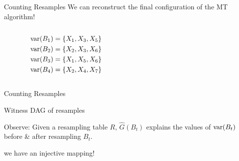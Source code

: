 \documentclass{beamer}
\def\spadding{\vspace{0.25cm}}
\def\b{\textcolor{blue}}
\def\r{\textcolor{red}}
\begin{document}
\begin{frame}{Counting Resamples}
We can reconstruct the final configuration of the MT algorithm!\spadding

\begin{columns}[T]
\begin{column}{.4\textwidth}
\centering\spadding

{\small
\vspace{-2em}\begin{align*}
\mathrm{var}(B_1) = \{X_1,X_3,X_5\} \\
\mathrm{var}(B_2) = \{X_2,X_3,X_6\} \\
\mathrm{var}(B_3) = \{X_1,X_5,X_6\} \\
\mathrm{var}(B_4) = \{X_2,X_4,X_7\}
\end{align*}
}
\end{column}\pause
\begin{column}{.4\textwidth}
\centering\spadding

\onslide<3->{resamples: \b{$B_1$}}\onslide<6,9->{, \r{$B_4$}}
\end{column}
\begin{column}{.1\textwidth}
\end{column}
\end{columns}\spadding



\end{frame}

\begin{frame}{Counting Resamples}
\begin{block}{Witness DAG of resamples}
\begin{center}

\end{center}

Observe: Given a resampling table $R$, $\hat{G}(B_t)$ explains the values of $\mathrm{var}(B_t)$ before \& after resampling $B_t$.\pause\spadding

\follows we have an injective mapping!
\end{block}
\end{frame}
\end{document}
